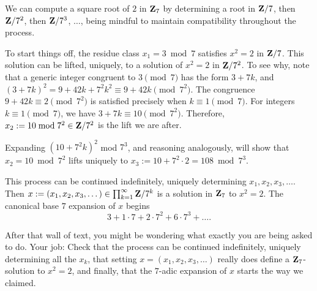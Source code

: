 \begin{prob} \label{ex:hensel0}\label{prob:98} We can compute a square root of $2$ in $\mathbf{Z}_7$ by determining a root in $\mathbf{Z}/7$, then $\mathbf{Z}/7^2$, then $\mathbf{Z}/7^3$, $\dots$, being mindful to maintain compatibility throughout the process.

To start things off, the residue class $x_1 = 3\bmod{7}$ satisfies $x^2 = 2$ in $\mathbf{Z}/7$. This solution can be lifted, uniquely, to a solution of $x^2=2$ in $\mathbf{Z}/7^2$. To see why, note that a generic integer congruent to $3\pmod{7}$ has the form $3+7k$, and 
$(3+7k)^2 = 9 + 42k + 7^2 k^2\equiv 9 + 42k\pmod{7^2}$. The congruence $9+42k\equiv 2\pmod{7^2}$ is satisfied precisely when $k\equiv 1\pmod{7}$. For integers $k\equiv 1\pmod{7}$, we have $3+7k\equiv 10\pmod{7^2}$. Therefore, $x_2:=10\bmod{7^2} \in \mathbf{Z}/7^2$ is the lift we are after.

Expanding $(10+7^2 k)^2$ mod $7^3$, and reasoning analogously, will show that $x_2=10\bmod{7^2}$ lifts uniquely to $x_3:=10+7^2\cdot 2 = 108\bmod{7^3}$. 

This process can be continued indefinitely, uniquely determining $x_1, x_2, x_3, \dots$. 
Then $x:=(x_1, x_2, x_3,\dots) \in \prod_{k=1}^{\infty} \mathbf{Z}/7^k$ is a solution in $\mathbf{Z}_7$ to $x^2=2$. The canonical base $7$ expansion of $x$ begins
\[  3 + 1\cdot 7 + 2\cdot 7^2 + 6\cdot 7^3 + \dots.\]

{\scriptsize After that wall of text, you might be wondering what exactly you are being asked to do. Your job: Check that the process can be continued indefinitely, uniquely determining all the $x_k$, that setting $x = (x_1, x_2, x_3, \dots)$ really does define a $\mathbf{Z}_7$-solution to $x^2=2$, and finally, that the $7$-adic expansion of $x$ starts the way we claimed.}
\end{prob}
















